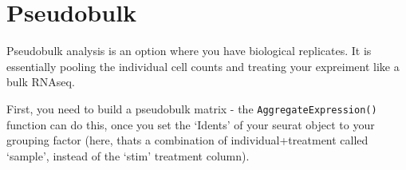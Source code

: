 \documentclass[
]{book}
\newenvironment{Shaded}{\begin{snugshade}}{\end{snugshade}}
\newcommand{\AttributeTok}[1]{\textcolor[rgb]{0.13,0.29,0.53}{#1}}
\newcommand{\CommentTok}[1]{\textcolor[rgb]{0.56,0.35,0.01}{\textit{#1}}}
\newcommand{\FunctionTok}[1]{\textcolor[rgb]{0.13,0.29,0.53}{\textbf{#1}}}
\newcommand{\NormalTok}[1]{#1}
\newcommand{\OtherTok}[1]{\textcolor[rgb]{0.56,0.35,0.01}{#1}}
\newcommand{\SpecialCharTok}[1]{\textcolor[rgb]{0.81,0.36,0.00}{\textbf{#1}}}
\newcommand{\StringTok}[1]{\textcolor[rgb]{0.31,0.60,0.02}{#1}}
\begin{document}
\section{Pseudobulk}\label{pseudobulk}

Pseudobulk analysis is an option where you have biological replicates. It is essentially pooling the individual cell counts and treating your expreiment like a bulk RNAseq.

First, you need to build a pseudobulk matrix - the \texttt{AggregateExpression()} function can do this, once you set the `Idents' of your seurat object to your grouping factor (here, thats a combination of individual+treatment called `sample', instead of the `stim' treatment column).

\begin{Shaded}
\end{Shaded}
\end{document}

